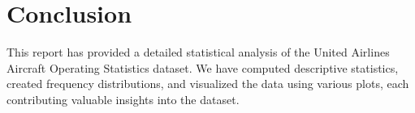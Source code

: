 \documentclass[a4paper,12pt]{article}
\begin{document}
\section*{Conclusion}
This report has provided a detailed statistical analysis of the United Airlines Aircraft Operating Statistics dataset. We have computed descriptive statistics, created frequency distributions, and visualized the data using various plots, each contributing valuable insights into the dataset.
\end{document}
